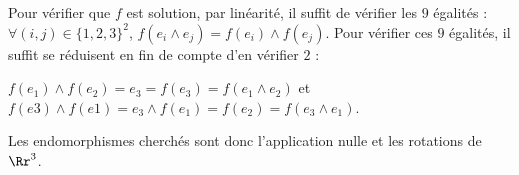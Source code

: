 {{Pour vérifier que $f$ est solution, par linéarité, il suffit de vérifier les $9$ égalités : $\forall(i,j)\in\{1,2,3\}^2$, $f(e_i\wedge e_j)=f(e_i)\wedge f(e_j)$. Pour vérifier ces $9$ égalités, il suffit se réduisent en fin de compte d'en vérifier $2$ :

\begin{center}
$f(e_1)\wedge f(e_2)= e_3 = f(e_3) = f(e_1\wedge e_2)$ et $f(e3)\wedge f(e1) = e_3\wedge f(e_1) = f(e_2) = f(e_3\wedge e_1)$.
\end{center}

Les endomorphismes cherchés sont donc l'application nulle et les rotations de $\Rr^3$.
}
}
